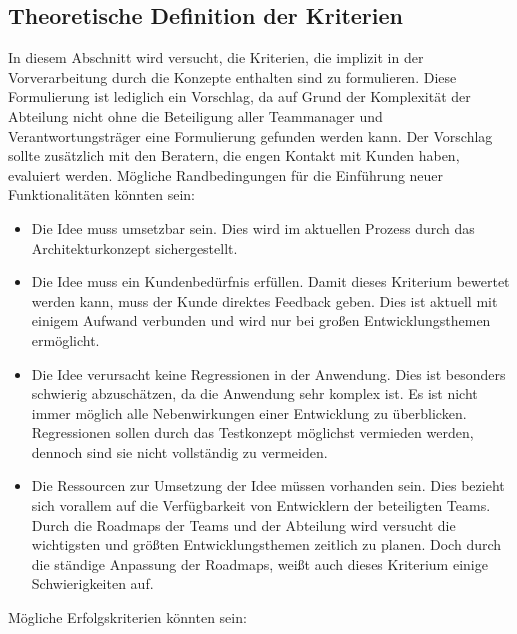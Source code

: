 \subsection{Theoretische Definition der Kriterien}\label{sec:feature-kriterien}
In diesem Abschnitt wird versucht, die Kriterien, die implizit in der Vorverarbeitung durch die Konzepte enthalten sind zu formulieren. 
Diese Formulierung ist lediglich ein Vorschlag, da auf Grund der Komplexität der Abteilung nicht ohne die Beteiligung aller Teammanager und Verantwortungsträger
eine Formulierung gefunden werden kann. Der Vorschlag sollte zusätzlich mit den Beratern, die engen Kontakt mit Kunden haben, evaluiert werden. 
Mögliche Randbedingungen für die Einführung neuer Funktionalitäten könnten sein: 
\begin{itemize}
    \item Die Idee muss umsetzbar sein. Dies wird im aktuellen Prozess durch das Architekturkonzept sichergestellt.
    \item Die Idee muss ein Kundenbedürfnis erfüllen. Damit dieses Kriterium bewertet werden kann, muss der Kunde direktes Feedback geben. Dies ist aktuell 
    mit einigem Aufwand verbunden und wird nur bei großen Entwicklungsthemen ermöglicht.
    \item Die Idee verursacht keine Regressionen in der Anwendung. Dies ist besonders schwierig abzuschätzen, da die Anwendung sehr komplex ist. Es ist 
    nicht immer möglich alle Nebenwirkungen einer Entwicklung zu überblicken. Regressionen sollen durch das Testkonzept möglichst vermieden werden, dennoch 
    sind sie nicht vollständig zu vermeiden.
    \item Die Ressourcen zur Umsetzung der Idee müssen vorhanden sein. Dies bezieht sich vorallem auf die Verfügbarkeit von Entwicklern der beteiligten Teams. 
    Durch die Roadmaps der Teams und der Abteilung wird versucht die wichtigsten und größten Entwicklungsthemen zeitlich zu planen. Doch durch die ständige Anpassung  
    der Roadmaps, weißt auch dieses Kriterium einige Schwierigkeiten auf. 
\end{itemize}
Mögliche Erfolgskriterien könnten sein: 
